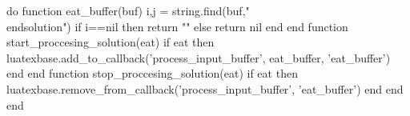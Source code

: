 


\RequirePackage{ifthen}
\RequirePackage{minipage}
\RequirePackage{}
\newcommand{\task}[1]{\fbox{\begin{minipage}{4em}\centering\it #1\end{minipage}}}
\newcommand{\makeboxlabel}[1]{\fbox{\begin{minipage}{2em}\centering\it #1\end{minipage}}\hfill}%
\newenvironment{tasklist}
  {\begin{list}
    {\arabic{boxlblcounter}}
    {\usecounter{boxlblcounter}
     \setlength{\labelwidth}{3em}
     \setlength{\labelsep}{0em}
     \setlength{\itemsep}{2pt}
     \setlength{\leftmargin}{1.5cm}
     \setlength{\rightmargin}{2cm}
     \setlength{\itemindent}{0em} 
     \let\makelabel=\makeboxlabel
    }
  }{\end{list}}



\newcommand{\hint}[1]{\ifthenelse{\boolean{ShowHint}}{\noindent\rotatebox[origin=c]{180}{\noindent
\begin{minipage}[t]{\linewidth} \noindent \it Указание: #1 \end{minipage}}}{}}

\makeatletter
\newenvironment{solution*}[1][\text{Решение}]{ 
  \par
  \pushQED{\qed}%
  \normalfont
  \topsep0pt \partopsep3pt
  \trivlist
  \item[\hskip\labelsep
    \itshape
    #1\@addpunct{.}]\ignorespaces
}{
  \ifthenelse{\boolean{ShowSolution}}{
    \popQED\endtrivlist\@endpefalse
    \addvspace{6pt plus 6pt} %
  }{\end{hidden}}
}
\makeatother

\RequirePackage{luacode}
\begin{luacode*}
do 
    function eat_buffer(buf)
        i,j = string.find(buf,"\\end{solution}")
        if i==nil then return "" else return nil end
    end
    function start_proccesing_solution(eat)
        if eat then luatexbase.add_to_callback('process_input_buffer', eat_buffer, 'eat_buffer') end
    end
    function stop_proccesing_solution(eat)
        if eat then luatexbase.remove_from_callback('process_input_buffer', 'eat_buffer') end
    end
end
\end{luacode*}
\ExplSyntaxOn
{}
\ExplSyntaxOff

